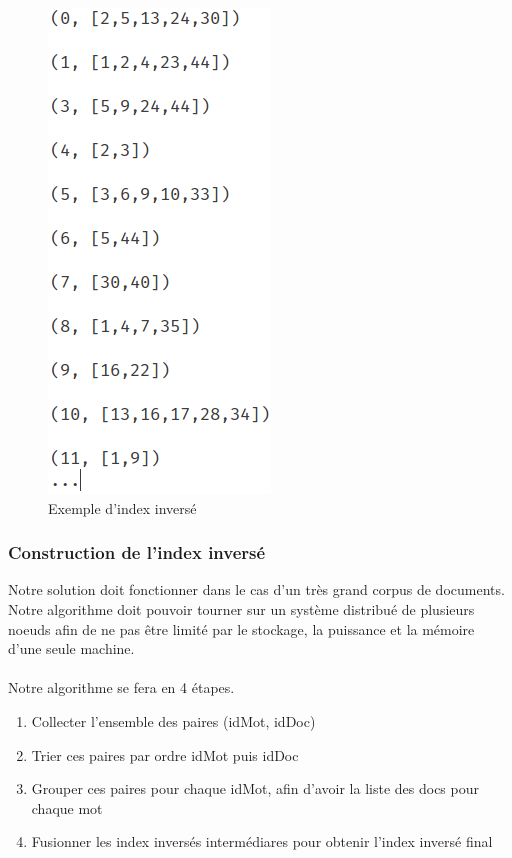 \documentclass[12pt,french,titlepage]{article}
\begin{document}
\begin{figure}[H]
    \centering
    \includegraphics[scale=0.6]{images/index_inverse}
    \caption{Exemple d'index inversé}
\end{figure}

\subsubsection{Construction de l'index inversé}

Notre solution doit fonctionner dans le cas d'un très grand corpus de documents. Notre algorithme doit pouvoir tourner sur un système distribué de plusieurs noeuds afin de ne pas être limité par le stockage, la puissance et la mémoire d'une seule machine. 
\\\\
Notre algorithme se fera en 4 étapes.
\begin{enumerate}
    \item Collecter l'ensemble des paires (idMot, idDoc)
    \item Trier ces paires par ordre idMot puis idDoc
    \item Grouper ces paires pour chaque idMot, afin d'avoir la liste des docs pour chaque mot
    \item Fusionner les index inversés intermédiares pour obtenir l'index inversé final
\end{enumerate}
\end{document}
